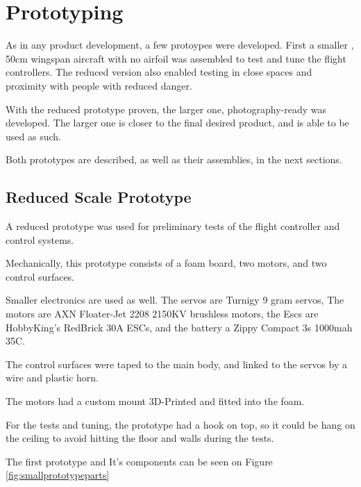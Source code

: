 \chapter{Prototyping} \label{chap:prototyping}

As in any product development, a few protoypes were developed.
First a smaller , 50cm wingspan aircraft with no airfoil was assembled to test and tune the flight controllers. The reduced version also enabled testing in close spaces and proximity with people with reduced danger.

With the reduced prototype proven, the larger one, photography-ready was developed. The larger one is closer to the final desired product, and is able to be used as such.

Both prototypes are described, as well as their assemblies, in the next sections.
 


\section{Reduced Scale Prototype}

A reduced prototype was used for preliminary tests of the flight controller and control systems.

Mechanically, this prototype consists of a foam board, two motors, and two control surfaces.

Smaller electronics are used as well. The servos are Turnigy 9 gram servos, The motors are AXN Floater-Jet 2208 2150KV brushless motors, the Escs are HobbyKing's RedBrick 30A ESCs, and the battery a Zippy Compact 3s 1000mah 35C.

The control surfaces were taped to the main body, and linked to the servos by a wire and plastic horn.

The motors had a custom mount 3D-Printed and fitted into the foam.

For the tests and tuning, the prototype had a hook on top, so it could be hang on the ceiling to avoid hitting the floor and walls during the tests.

The first prototype and It's components can be seen on Figure \ref{fig:smallprototypeparts}

